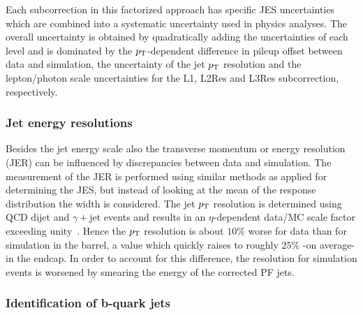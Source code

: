 Each subcorrection in this factorized approach has specific JES uncertainties which are combined into a systematic uncertainty used in physics analyses. The overall uncertainty is obtained by quadratically adding the uncertainties of each level and is dominated by the $p_{\rm T}$-dependent difference in pileup offset between data and simulation, the uncertainty of the jet $p_{\rm T}$ resolution and the lepton/photon scale uncertainties for the L1, L2Res and L3Res subcorrection, respectively.

\subsubsection*{Jet energy resolutions}
Besides the jet energy scale also the transverse momentum or energy resolution (JER) can be influenced by discrepancies between data and simulation. %
The measurement of the JER is performed using similar methods as applied for determining the JES, but instead of looking at the mean of the response distribution the width is considered.
The jet $p_{\rm T}$ resolution is determined using QCD dijet and $\gamma+$jet events and results in an $\eta$-dependent data/MC scale factor exceeding unity~\cite{}. Hence the $p_{\rm T}$ resolution is about $10 \%$ worse for data than for simulation in the barrel, a value which quickly raises to roughly $25\%$ -on average- in the endcap. In order to account for this difference, the resolution for simulation events is worsened by smearing the energy of the corrected PF jets.

\subsubsection*{Identification of b-quark jets}


